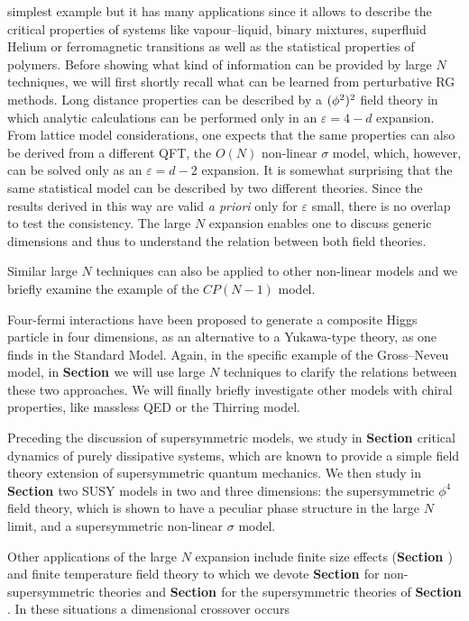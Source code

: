 simplest example but it has many applications since it allows to
describe the critical properties of systems like vapour--liquid,
binary mixtures, superfluid Helium or ferromagnetic transitions as
well as the statistical properties of polymers. Before showing
what kind of information can be provided by large $N$ techniques,
we will first shortly recall what can be learned from perturbative
RG methods.
Long distance properties can be described by a
$({\phi}^2)^2$ field theory in which analytic calculations can be performed
only in an $\varepsilon=4-d$ expansion. From lattice model considerations, one expects that
the same properties can also be derived from a different
 QFT,  the $O(N)$ non-linear $\sigma$ model, which, however, can be solved only
as an $\varepsilon=d-2$ expansion. It is somewhat surprising
that the same statistical model can be described by two different
theories. Since the results derived in this  way are valid {\it a
priori}\/ only for $\varepsilon$ small, there is no overlap to
test the consistency. The large $N$ expansion  enables one  to
discuss generic dimensions and thus to understand the relation
between both field theories. \par
Similar large $N$ techniques can also be applied to other non-linear models
and we briefly examine the example of the $CP(N-1)$ model. \par
Four-fermi interactions have been
proposed to generate a composite Higgs particle in four
dimensions, as an alternative to a Yukawa-type theory, as one
finds in the Standard Model. Again, in the specific example of
the Gross--Neveu model, in {\bf Section \label{\ssNfermions}}  we will use large $N$
techniques to clarify the relations between these two approaches.
We will finally briefly investigate other
models with chiral properties, like massless QED or the Thirring
model.\par
Preceding the
discussion of supersymmetric models, we study  in {\bf Section \label{\ssCrDY}}
critical dynamics of purely dissipative systems, which are known
to provide a simple field theory extension of supersymmetric quantum mechanics. We
then study in {\bf Section \label{\ssNSUSYsc}} two SUSY models in two and three dimensions: the
supersymmetric $\phi^4$ field theory, which is shown to have a
peculiar phase structure in the large $N$ limit, and a
supersymmetric non-linear $\sigma$ model. \par
Other applications of the large $N$ expansion include finite size effects ({\bf Section \label{\ssNFSS}}) and finite temperature field theory to which we devote {\bf Section \label{\scFTQFT}} for non-supersymmetric theories and  {\bf Section \label{\ssNSUSYT}} for the supersymmetric theories of  {\bf Section \label{\ssNSUSYsc}}. In these situations a dimensional crossover occurs
